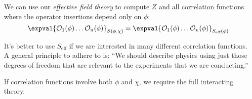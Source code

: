 \documentclass{jknotes}
\begin{document}
We can use our \emph{effective field theory} to compute \(Z\) and all correlation functions where the operator insertions depend only on \(\phi\):
\begin{equation}
    \expval{\mathcal{O}_1(\phi)\dots\mathcal{O}_n(\phi)}_{S(\phi,\chi)} = \expval{\mathcal{O}_1(\phi)\dots\mathcal{O}_n(\phi)}_{S_{\text{eff}}(\phi)}
\end{equation}

It's better to use \(S_{\text{eff}}\) if we are interested in many different correlation functions. A general principle to adhere to is: ``We should describe physics using just those degrees of freedom that are relevant to the experiments that we are conducting.''

If correlation functions involve both \(\phi\) and \(\chi\), we require the full interacting theory.
\end{document}
